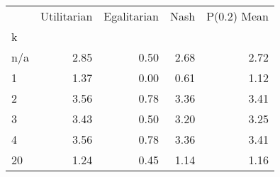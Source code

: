 \begin{tabular}{lrrrr}
\toprule
 & Utilitarian & Egalitarian & Nash & P(0.2) Mean \\
k &  &  &  &  \\
\midrule
n/a & 2.85 & 0.50 & 2.68 & 2.72 \\
1 & 1.37 & 0.00 & 0.61 & 1.12 \\
2 & 3.56 & 0.78 & 3.36 & 3.41 \\
3 & 3.43 & 0.50 & 3.20 & 3.25 \\
4 & 3.56 & 0.78 & 3.36 & 3.41 \\
20 & 1.24 & 0.45 & 1.14 & 1.16 \\
\bottomrule
\end{tabular}
